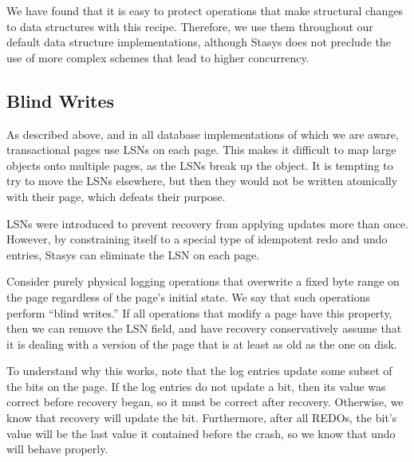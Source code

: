 \documentclass[letterpaper,twocolumn,10pt]{article}
\newcommand{\yad}{Stasys\xspace}
\newcommand{\eat}[1]{}
\begin{document}
We have found that it is easy to protect operations that make
structural changes to data structures with this recipe.
Therefore, we use them throughout our default data structure
implementations, although \yad does not preclude the use of more
complex schemes that lead to higher concurrency.


\subsection{Blind Writes}
\label{sec:blindWrites}
As described above, and in all database implementations of which we
are aware, transactional pages use LSNs on each page.  This makes it
difficult to map large objects onto multiple pages, as the LSNs break
up the object.  It is tempting to try to move the LSNs elsewhere, but
then they would not be written atomically with their page, which
defeats their purpose.

LSNs were introduced to prevent recovery from applying updates more
than once. However, by constraining itself to a special type of idempotent redo and undo
entries,
\yad can eliminate the LSN on each page.

Consider purely physical logging operations that overwrite a fixed
byte range on the page regardless of the page's initial state.  
We say that such operations perform ``blind writes.''
If all
operations that modify a page have this property, then we can remove
the LSN field, and have recovery conservatively assume that it is
dealing with a version of the page that is at least as old as the one
on disk.  

\eat{
This allows non-idempotent operations to be implemented.  For
example, a log entry could simply tell recovery to increment a value
on a page by some value, or to allocate a new record on the page.  
If the recovery algorithm did not know exactly which
version of a page it is dealing with, the operation could
inadvertently be applied more than once, incrementing the value twice,
or double allocating a record.
}

To understand why this works, note that the log entries
update some subset of the bits on the page.  If the log entries do not
update a bit, then its value was correct before recovery began, so it
must be correct after recovery.  Otherwise, we know that recovery will
update the bit.  Furthermore, after all REDOs, the bit's value will be the
last value it contained before the crash, so we know that undo will behave
properly.
\end{document}

